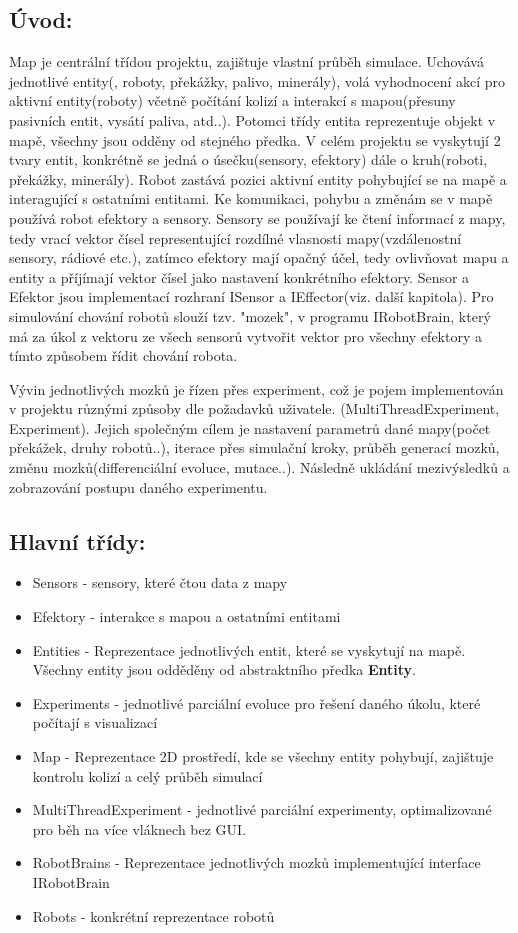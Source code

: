 \documentclass[12pt, oneside]{article}
\begin{document}
\subsection{Úvod:}
Map je centrální třídou projektu, zajištuje vlastní průběh simulace. Uchovává jednotlivé entity(, roboty,  překážky, palivo, minerály), volá vyhodnocení akcí pro aktivní entity(roboty) včetně počítání kolizí a interakcí s mapou(přesuny pasivních entit, vysátí paliva, atd..). Potomci třídy entita reprezentuje objekt v mapě, všechny jsou  odděny od stejného předka. V celém projektu se vyskytují 2 tvary entit, konkrétně se jedná o úsečku(sensory, efektory) dále o kruh(roboti, překážky, minerály). Robot zastává pozici aktivní entity pohybující se na mapě a interagující s ostatními entitami. Ke komunikaci, pohybu a změnám se v mapě používá robot efektory a sensory. Sensory se používají ke čtení informací z mapy, tedy vrací vektor čísel representující rozdílné vlasnosti mapy(vzdálenostní sensory, rádiové etc.), zatímco efektory mají opačný účel, tedy ovlivňovat mapu a entity a příjímají vektor čísel jako nastavení konkrétního efektory. Sensor a Efektor jsou implementací rozhraní ISensor a IEffector(viz. další kapitola). Pro simulování chování robotů slouží tzv. "mozek", v programu IRobotBrain, který má za úkol z vektoru ze všech sensorů vytvořit vektor pro všechny efektory a tímto způsobem řídit chování robota. \par
Vývin jednotlivých mozků je řízen přes experiment, což je pojem implementován v projektu různými způsoby dle požadavků uživatele. (MultiThreadExperiment, Experiment). Jejich společným cílem je nastavení parametrů dané mapy(počet překážek, druhy robotů..), iterace přes simulační kroky, průběh generací mozků, změnu mozků(differenciální evoluce, mutace..). Následně ukládání mezivýsledků a zobrazování postupu daného experimentu. 
\subsection{Hlavní třídy:}
\begin{itemize}
\item Sensors - sensory, které čtou data z  mapy 
\item Efektory - interakce s mapou a ostatními entitami
\item Entities - Reprezentace jednotlivých entit, které se vyskytují na mapě. Všechny entity jsou odděděny od abstraktního předka \textbf{Entity}. 
\item Experiments - jednotlivé parciální evoluce pro řešení daného úkolu, které počítají s visualizací
\item Map - Reprezentace 2D prostředí, kde se všechny entity pohybují, zajištuje kontrolu kolizí a celý průběh simulací
\item MultiThreadExperiment - jednotlivé parciální experimenty, optimalizované pro  běh na více vláknech bez GUI. 
\item RobotBrains - Reprezentace jednotlivých mozků implementující interface IRobotBrain
\item Robots - konkrétní reprezentace robotů 
\end{itemize}
\newpage
\end{document}
